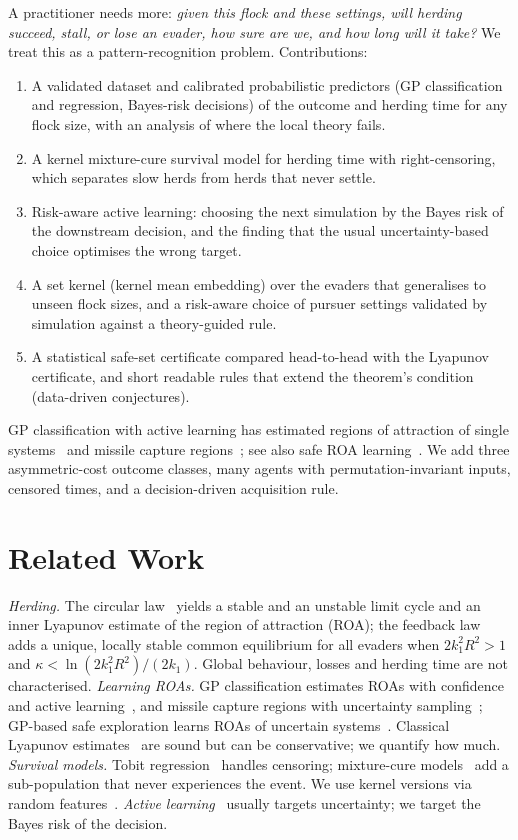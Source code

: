\documentclass[conference]{IEEEtran}
\begin{document}
A practitioner needs more: \emph{given this flock and these settings, will herding succeed, stall, or lose an evader,
how sure are we, and how long will it take?} We treat this as a pattern-recognition problem. Contributions:
\begin{enumerate}
\item A validated dataset and calibrated probabilistic predictors (GP classification and regression, Bayes-risk
decisions) of the outcome and herding time for any flock size, with an analysis of where the local theory fails.
\item A kernel mixture-cure survival model for herding time with right-censoring, which separates slow herds from
herds that never settle.
\item Risk-aware active learning: choosing the next simulation by the Bayes risk of the downstream decision, and the
finding that the usual uncertainty-based choice optimises the wrong target.
\item A set kernel (kernel mean embedding) over the evaders that generalises to unseen flock sizes, and a
risk-aware choice of pursuer settings validated by simulation against a theory-guided rule.
\item A statistical safe-set certificate compared head-to-head with the Lyapunov certificate, and short readable rules
that extend the theorem's condition (data-driven conjectures).
\end{enumerate}
GP classification with active learning has estimated regions of attraction of single systems~\cite{wang2023roa}
and missile capture regions~\cite{lee2022capture}; see also safe ROA learning~\cite{berkenkamp2016}. We add three
asymmetric-cost outcome classes, many agents with permutation-invariant inputs, censored times, and a decision-driven
acquisition rule.

\section{Related Work}
\emph{Herding.} The circular law~\cite{singh2024cdc} yields a stable and an unstable limit cycle and an inner Lyapunov
estimate of the region of attraction (ROA); the feedback law~\cite{singh2025arxiv} adds a unique, locally stable
common equilibrium for all evaders when $2k_1^2R^2>1$ and $\kappa<\ln(2k_1^2R^2)/(2k_1)$. Global behaviour, losses and
herding time are not characterised.
\emph{Learning ROAs.} GP classification estimates ROAs with confidence and active learning~\cite{wang2023roa}, and
missile capture regions with uncertainty sampling~\cite{lee2022capture}; GP-based safe exploration learns ROAs of
uncertain systems~\cite{berkenkamp2016}. Classical Lyapunov estimates~\cite{khalil2002,davison1971} are sound but can be
conservative; we quantify how much.
\emph{Survival models.} Tobit regression~\cite{tobin1958} handles censoring; mixture-cure models~\cite{farewell1982} add a
sub-population that never experiences the event. We use kernel versions via random features~\cite{rahimi2007rff}.
\emph{Active learning}~\cite{settles2009} usually targets uncertainty; we target the Bayes risk of the decision.
\end{document}
